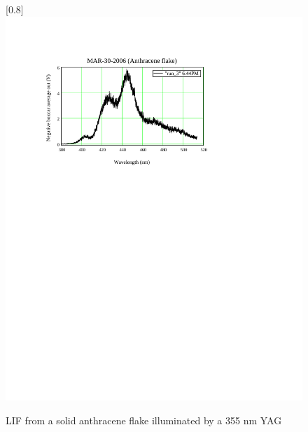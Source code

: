 \begin{figure}
\scalebox{0.8}[0.8]{
\includegraphics[bb=0 500 489 700]
{355_anthracene/355_anthracene.pdf}
}
\caption[LIF from a solid anthracene flake illuminated by a 355 nm YAG]{LIF from a solid anthracene flake illuminated by a 355 nm YAG}
\label{355_anthracene}
\end{figure}
